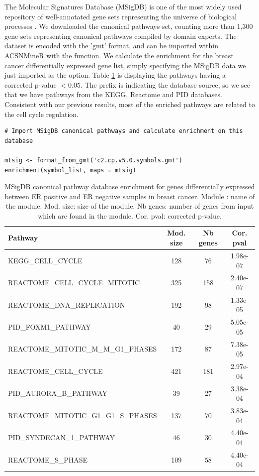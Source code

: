 \documentclass[article]{jss}
\begin{document}
The Molecular Signatures Database (MSigDB) is one of the most widely used
repository of well-annotated  gene sets representing the universe of biological
processes \citep{liberzon2011molecular}. We downloaded the canonical pathways
set, counting more than 1,300 gene sets representing canonical pathways compiled
by domain experts. The dataset is encoded with the 'gmt' format, and can be
imported within ACSNMineR with the  function. We
calculate the enrichment for the breast cancer differentially expressed gene
list, simply specifying the MSigDB data we just imported as the 
option. Table \ref{tab:table_msigdb} is displaying the pathways having a
corrected p-value $< 0.05$. The prefix is indicating the database source, so we
see that we have pathways from the KEGG, Reactome and PID databases. Consistent
with our previous results, most of the enriched pathways are related to the cell
cycle regulation. 


\begin{verbatim}
# Import MSigDB canonical pathways and calculate enrichment on this database 

mtsig <- format_from_gmt('c2.cp.v5.0.symbols.gmt')
enrichment(symbol_list, maps = mtsig)

\end{verbatim}


\begin{table}[h!]
  \centering
  \caption{MSigDB canonical pathway database enrichment for genes differentially expressed between ER
positive and ER negative samples in breast cancer.  Module : name of the
module. Mod. size: size of the module. Nb genes: number of genes from input
which are found in the module. Cor. pval: corrected p-value.}
\label{tab:table_msigdb}

\begin{tabular}{l|c|c|c}
\hline
Pathway & Mod. size & Nb genes & Cor. pval\\
\hline
KEGG\_CELL\_CYCLE & 128 & 76 & 1.98e-07\\
REACTOME\_CELL\_CYCLE\_MITOTIC & 325 & 158 & 2.40e-07\\
REACTOME\_DNA\_REPLICATION & 192 & 98 & 1.33e-05\\
PID\_FOXM1\_PATHWAY & 40 & 29 & 5.05e-05\\
REACTOME\_MITOTIC\_M\_M\_G1\_PHASES & 172 & 87 & 7.38e-05\\
REACTOME\_CELL\_CYCLE & 421 & 181 & 2.97e-04\\
PID\_AURORA\_B\_PATHWAY & 39 & 27 & 3.38e-04\\
REACTOME\_MITOTIC\_G1\_G1\_S\_PHASES & 137 & 70 & 3.83e-04\\ 
PID\_SYNDECAN\_1\_PATHWAY & 46 & 30 & 4.40e-04\\
REACTOME\_S\_PHASE & 109 & 58 & 4.40e-04\\
\hline
\end{tabular}
\end{table}
\end{document}
